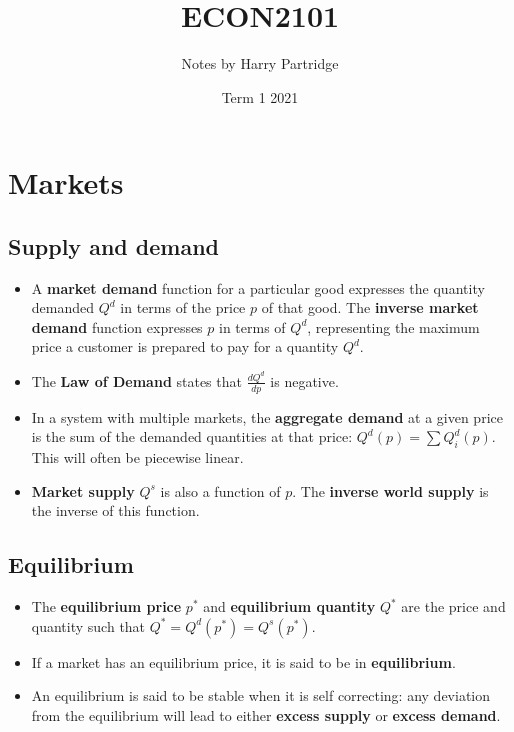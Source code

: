 \documentclass[a4paper]{article}
\title{ECON2101}
\author{Notes by Harry Partridge}
\date{Term 1 2021}
\begin{document}
\maketitle

\tableofcontents

\newpage

\section{Markets}
\subsection{Supply and demand}
\begin{itemize}
    \item A \textbf{market demand} function for a particular good expresses the quantity demanded $Q^d$ in terms of the price $p$ of that good. The \textbf{inverse market demand} function expresses $p$ in terms of $Q^d$, representing the maximum price a customer is prepared to pay for a quantity $Q^d$.
    \item The \textbf{Law of Demand} states that $\frac{dQ^d}{dp}$ is negative.  
    \item In a system with multiple markets, the \textbf{aggregate demand} at a given price is the sum of the demanded quantities at that price: $Q^d(p) = \sum Q^d_i(p)$. This will often be piecewise linear.
    \item \textbf{Market supply} $Q^s$ is also a function of $p$. The \textbf{inverse world supply} is the inverse of this function. 
\end{itemize}

\subsection{Equilibrium}
\begin{itemize}
    \item The \textbf{equilibrium price} $p^*$ and \textbf{equilibrium quantity} $Q^*$ are the price and quantity such that $Q^* = Q^d(p^*) = Q^s(p^*)$. 
    \item If a market has an equilibrium price, it is said to be in \textbf{equilibrium}.
    \item An equilibrium is said to be stable when it is self correcting: any deviation from the equilibrium will lead to either \textbf{excess supply} or \textbf{excess demand}. 
\end{itemize}
\end{document}
